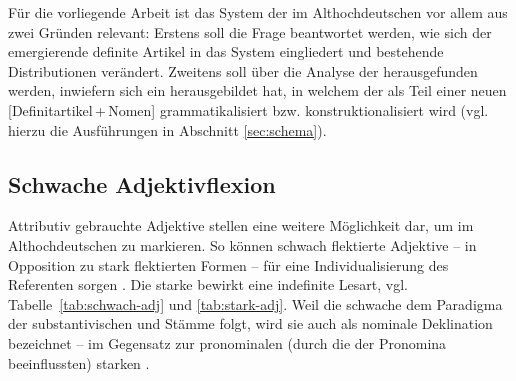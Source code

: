Für die vorliegende Arbeit ist das System der  im Althochdeutschen  vor allem aus zwei Gründen relevant: Erstens soll die Frage beantwortet werden, wie sich der emergierende definite Artikel in das System eingliedert und bestehende Distributionen verändert. Zweitens soll über die Analyse der  herausgefunden werden, inwiefern sich ein  herausgebildet hat, in welchem der  als Teil einer neuen  [Definitartikel\,+\,Nomen] grammatikalisiert  bzw. konstruktionalisiert  wird (vgl. hierzu die Ausführungen in Abschnitt \ref{sec:schema}). 

\subsection{Schwache Adjektivflexion} \label{schwache-Adjektivflexion}

Attributiv gebrauchte Adjektive  stellen eine weitere Möglichkeit dar, um im Althochdeutschen  zu markieren. So können schwach flektierte  Adjektive -- in Opposition zu stark flektierten Formen -- für eine Individualisierung des Referenten sorgen \parencite[68]{Szczepaniak2011a}. Die starke  bewirkt eine indefinite  Lesart, vgl. Tabelle~\ref{tab:schwach-adj} und \ref{tab:stark-adj}.  Weil die schwache  dem Paradigma der substantivischen  und Stämme folgt, wird sie auch als nominale Deklination bezeichnet -- im Gegensatz zur pronominalen  (durch die  der Pronomina beeinflussten) starken  \parencite[s.][251]{Meineke2001}. 

